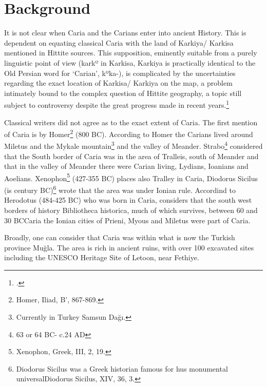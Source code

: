\section{Background}

It is not clear when Caria and the Carians enter into ancient History.
This is dependent on equating classical Caria with the land of Karkiya/
Karkisa mentioned in Hittite sources. This supposition, eminently suitable
from a purely linguistic point of view (karkº in Karkisa, Karkiya
is practically identical to the Old Persian word for ‘Carian’, kºka-), is
complicated by the uncertainties regarding the exact location of Karkisa/
Karkiya on the map, a problem intimately bound to the complex question
of Hittite geography, a topic still subject to controversy despite the
great progress made in recent years.\footcite{adiego}

Classical writers did not agree as to the exact extent of Caria. The first mention of Caria is by Homer\footnote{Homer, Iliad, B', 867-869.} (800 BC). According to Homer the Carians lived around Miletus and the Mykale mountain\footnote{Currently in Turkey Samsun Dağı.} and the valley of Meander. 
Strabo\footnote{63 or 64 BC- c.24 AD} considered that the South border of Caria was in the area of Tralleis, south of Meander and that in the valley of Meander there were Carian living, Lydians, Ioanians and Aoelians. 
Xenophon\footnote{Xenophon, Greek, III, 2, 19.} (427-355 BC) places also Tralley in Caria, Diodorus Sicilus (is century BC)\footnote{Diodorus Sicilus was a Greek historian famous for hus monumental universalDiodorus Sicilus, XIV, 36, 3.} wrote that the area was under Ionian rule. 
Accordind to Herodotus (484-425 BC) who was born in Caria, considers that the south west borders of  history Bibliotheca historica, much of which survives, between 60 and 30 BCCaria the Ionian cities of Prieni, Myous and Miletus were part of Caria.

Broadly, one can consider that Caria was within what is now the Turkish province Muğla. The area is rich in ancient ruins, with over 100 excavated sites including the UNESCO Heritage Site of Letoon, near Fethiye.

